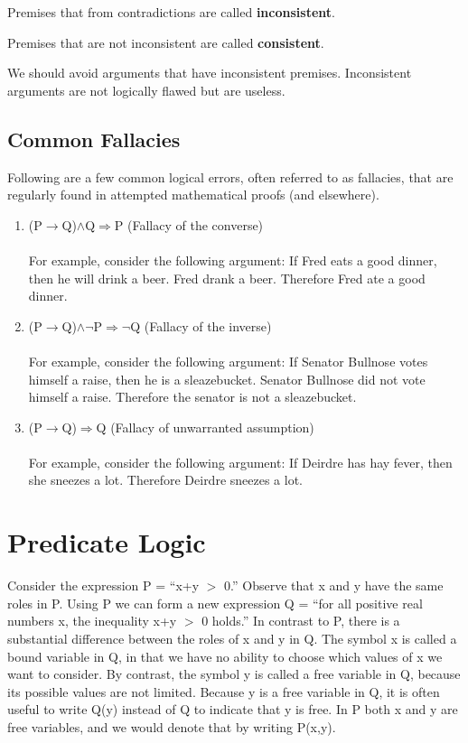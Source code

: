 \documentclass[]{article}
\begin{document}
\begin{defn} Premises that from contradictions are called \textbf{inconsistent}. 
\end{defn}
\begin{defn} Premises that are not inconsistent are called \textbf{consistent}.
\end{defn}
\begin{rem}We should avoid arguments that have inconsistent premises. Inconsistent arguments are not logically flawed but are useless.
\end{rem}


\subsection{Common Fallacies}
Following are a few common logical errors, often referred to as fallacies, that are
regularly found in attempted mathematical proofs (and elsewhere).
\begin{enumerate}
	\item (P$\rightarrow$Q)$\wedge$Q$\Rightarrow$P (Fallacy of the converse)
	\\\\ For example, consider the following argument: If Fred eats a good dinner, then he will drink a beer. Fred drank a beer.
	Therefore Fred ate a good dinner.
	\item (P$\rightarrow$Q)$\wedge$$\neg$P$\Rightarrow$$\neg$Q (Fallacy of the inverse)
	\\\\ For example, consider the following argument: If Senator Bullnose votes himself a raise, then he is a sleazebucket. Senator Bullnose did not vote himself a raise. Therefore the senator is not a sleazebucket.
	\item (P$\rightarrow$Q)$\Rightarrow$Q (Fallacy of unwarranted assumption)
	\\\\ For example, consider the following argument: If Deirdre has hay fever, then she sneezes a lot. Therefore Deirdre sneezes a
	lot.
\end{enumerate}

\section{Predicate Logic}

 Consider the expression P = ``x+y $>$ 0.'' Observe that x and y have the same roles in P. Using P we can form a new expression Q = ``for all positive real numbers x, the inequality x+y $>$ 0 holds.'' In contrast to P, there is a substantial difference between the roles of x and y in Q. The symbol x is called a bound variable in Q, in that we have no ability to choose which values of x we want to consider. By contrast, the symbol y is called a free variable in Q, because its possible values are not limited. Because y is a free variable in Q, it is often useful to write Q(y) instead of Q to indicate that y is free. In P both x and y are free variables, and we would denote that by writing P(x,y).
\end{document}
